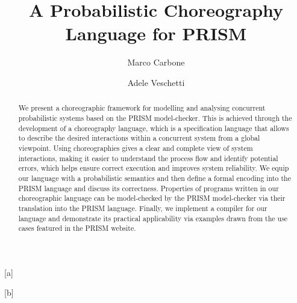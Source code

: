 \documentclass{lmcs} %
\theoremstyle{plain}\newtheorem{satz}[thm]{Satz} %
\def\eg{{\em e.g.}}
\begin{document}
\title[A Probabilistic Choreography Language for PRISM]
{A Probabilistic Choreography Language for PRISM}

\author[M.~Carbone]{Marco Carbone}[a]
\author[A.~Veschetti]{Adele Veschetti}[b]

\address{Computer Science Department, IT University of Copenhagen, Rued Langgaards Vej 7, 2300 Copenhagen S, Denmark}	%

\address{Department of Computer Science, TU Darmstadt, Hochschulstraße 10, 64289 Darmstadt, Germany} %

\begin{abstract}
  \noindent We present a choreographic framework for modelling and
  analysing concurrent probabilistic systems based on the PRISM
  model-checker. This is achieved through the development of a
  choreography language, which is a specification language that allows
  to describe the desired interactions within a concurrent system from
  a global viewpoint. Using choreographies gives a clear and complete
  view of system interactions, making it easier to understand the
  process flow and identify potential errors, which helps ensure
  correct execution and improves system reliability. We equip our
  language with a probabilistic semantics and then define a formal
  encoding into the PRISM language and discuss its
  correctness. Properties of programs written in our choreographic
  language can be model-checked by the PRISM model-checker via their
  translation into the PRISM language.  Finally, we implement a
  compiler for our language and demonstrate its practical
  applicability via examples drawn from the use cases featured in the
  PRISM website.
\end{abstract}
\end{document}
